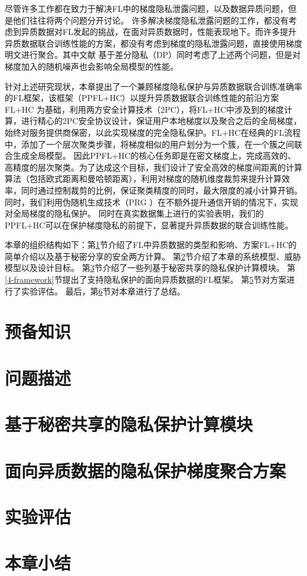 尽管许多工作都在致力于解决FL中的梯度隐私泄露问题，以及数据异质问题，但是他们往往将两个问题分开讨论。
许多解决梯度隐私泄露问题的工作，都没有考虑到异质数据对FL发起的挑战，在面对异质数据时，性能表现地下。而许多提升异质数据联合训练性能的方案，都没有考虑到梯度的隐私泄露问题，直接使用梯度明文进行聚合。其中文献 \cite{xiong2021privacy} 基于差分隐私（DP）同时考虑了上述两个问题，但是对梯度加入的随机噪声也会影响全局模型的性能。

针对上述研究现状，本章提出了一个兼顾梯度隐私保护与异质数据联合训练准确率的FL框架，该框架（PPFL+HC）以提升异质数据联合训练性能的前沿方案FL+HC \cite{briggs2020federated} 为基础，利用两方安全计算技术（2PC），将FL+HC中涉及到的梯度计算，进行精心的2PC安全协议设计，保证用户本地梯度以及聚合之后的全局梯度，始终对服务提供商保密，以此实现梯度的完全隐私保护。FL+HC在经典的FL流程中，添加了一个层次聚类步骤，将梯度相似的用户划分为一个簇，在一个簇之间联合生成全局模型。
因此PPFL+HC的核心任务即是在密文梯度上，完成高效的、高精度的层次聚类。为了达成这个目标，我们设计了安全高效的梯度间距离的计算算法（包括欧式距离和曼哈顿距离），利用对梯度的随机维度裁剪来提升计算效率，同时通过控制裁剪的比例，保证聚类精度的同时，最大限度的减小计算开销。同时，我们利用伪随机生成技术（PRG \cite{yao1982theory}）在不额外提升通信开销的情况下，实现对全局梯度的隐私保护。
同时在真实数据集上进行的实验表明，我们的PPFL+HC可以在保护梯度隐私的前提下，显著提升异质数据的联合训练性能。

本章的组织结构如下：第\ref{4-pre}节介绍了FL中异质数据的类型和影响、方案FL+HC的简单介绍以及基于秘密分享的安全两方计算。
第\ref{4-problem}节介绍了本章的系统模型、威胁模型以及设计目标。
第\ref{4-building}节介绍了一些列基于秘密共享的隐私保护计算模块。
第\ref{4-framework}节提出了支持隐私保护的面向异质数据的FL框架。
第\ref{4-exp}节对方案进行了实验评估。
最后，第\ref{4-conclusion}节对本章进行了总结。

\section{预备知识}\label{4-pre}

\section{问题描述}\label{4-problem}

\section{基于秘密共享的隐私保护计算模块}\label{4-building}

\section{面向异质数据的隐私保护梯度聚合方案}\label{4-framwork}

\section{实验评估}\label{4-exp}

\section{本章小结}\label{4-conclusion}
